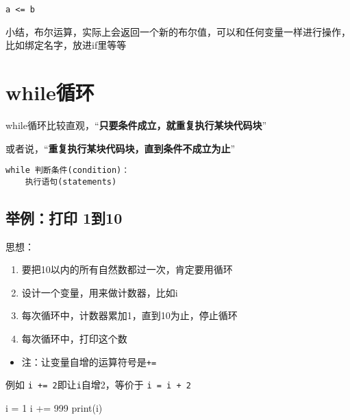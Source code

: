 \documentclass[
  letterpaper,
  DIV=11,
  numbers=noendperiod]{scrreprt}
\newenvironment{Shaded}{\begin{snugshade}}{\end{snugshade}}
\newcommand{\BuiltInTok}[1]{\textcolor[rgb]{0.00,0.23,0.31}{#1}}
\newcommand{\DecValTok}[1]{\textcolor[rgb]{0.68,0.00,0.00}{#1}}
\newcommand{\NormalTok}[1]{\textcolor[rgb]{0.00,0.23,0.31}{#1}}
\newcommand{\OperatorTok}[1]{\textcolor[rgb]{0.37,0.37,0.37}{#1}}
\providecommand{\tightlist}{%
  \setlength{\itemsep}{0pt}\setlength{\parskip}{0pt}}\usepackage{longtable,booktabs,array}
\begin{document}
\begin{verbatim}
a <= b
\end{verbatim}

小结，布尔运算，实际上会返回一个新的布尔值，可以和任何变量一样进行操作，比如绑定名字，放进if里等等

\hypertarget{whileux5faaux73af}{%
\section{while循环}\label{whileux5faaux73af}}

while循环比较直观，``\textbf{只要条件成立，就重复执行某块代码块}''

或者说，``\textbf{重复执行某块代码块，直到条件不成立为止}''

\begin{verbatim}
while 判断条件(condition)：
    执行语句(statements)
\end{verbatim}

\hypertarget{ux4e3eux4f8bux6253ux5370-1ux523010}{%
\subsection{举例：打印 1到10}\label{ux4e3eux4f8bux6253ux5370-1ux523010}}

思想：

\begin{enumerate}
\def\labelenumi{\arabic{enumi}.}
\tightlist
\item
  要把10以内的所有自然数都过一次，肯定要用循环
\item
  设计一个变量，用来做计数器，比如i
\item
  每次循环中，计数器累加1，直到10为止，停止循环
\item
  每次循环中，打印这个数
\end{enumerate}

\begin{itemize}
\tightlist
\item
  注：让变量自增的运算符号是\texttt{+=}
\end{itemize}

例如 \texttt{i\ +=\ 2}即让\texttt{i}自增2，等价于 \texttt{i\ =\ i\ +\ 2}

\begin{Shaded}
\begin{Highlighting}[]
\NormalTok{i }\OperatorTok{=} \DecValTok{1}
\NormalTok{i }\OperatorTok{+=} \DecValTok{999}
\BuiltInTok{print}\NormalTok{(i)}
\end{Highlighting}
\end{Shaded}
\end{document}
